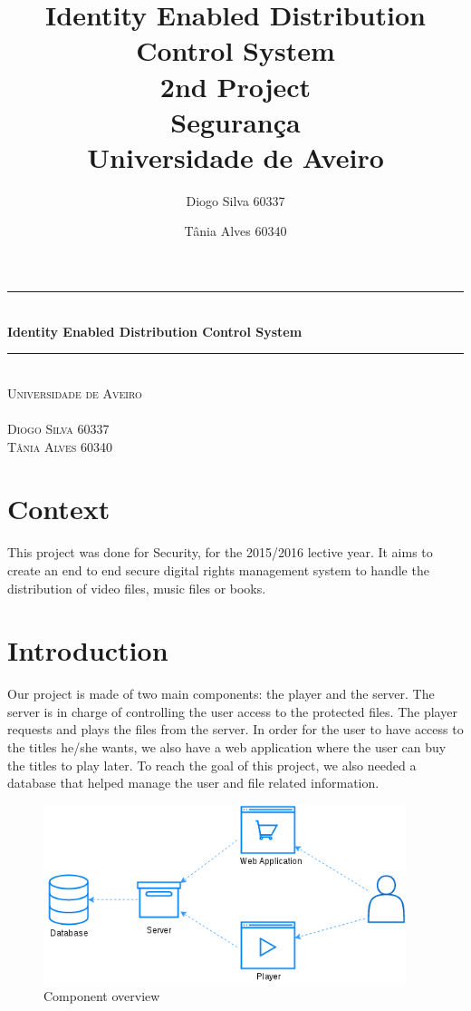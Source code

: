 \documentclass[11pt,a4paper]{report}
\title{\textbf{Identity Enabled Distribution Control System} \\2nd Project\\ Segurança\\Universidade de Aveiro}
\author{Diogo Silva 60337 \and Tânia Alves 60340 }
\newcommand{\HRule}{\rule{\linewidth}{0.5mm}}
\begin{document}
\begin{titlepage}
\begin{center}
\HRule \\[0.4cm]
{ \huge \bfseries Identity Enabled Distribution Control System \\[0.4cm] }
\HRule \\[1.5cm]
\textsc{\LARGE Universidade de Aveiro}\\[1.5cm]
\textsc{}\\[1.5cm]
\textsc{Diogo Silva 60337 \\Tânia Alves 60340 }
\end{center}
\end{titlepage}
\maketitle
\tableofcontents
\nocite{*}
\chapter*{Context}
This project was done for Security, for the 2015/2016 lective year.
It aims to create an end to end secure digital rights management system to handle the distribution of video files, music files or books.

\chapter*{Introduction}

Our project is made of two main components: the player and the server.
The server is in charge of controlling the user access to the protected files. 
The player requests and plays the files from the server.
In order for the user to have access to the titles he/she wants, we also have a web application where the user can buy the titles to play later.
To reach the goal of this project, we also needed a database that helped manage the user and file related information.

\begin{figure}[H]
\centerline{\includegraphics[width=300pt]{images/overview.png}}
\caption{Component overview}
\label{schema}
\end{figure}
\end{document}
